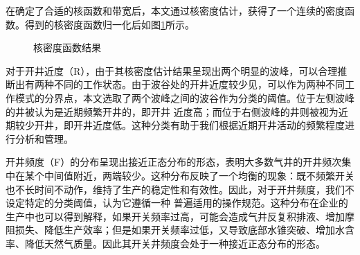 在确定了合适的核函数和带宽后，本文通过核密度估计，获得了一个连续的密度函数。得到的核密度函数归一化后如图\ref{fig:KDE}所示。
\begin{figure}[H]
    \centering
    \hfil
    \hfil
    \caption{核密度函数结果}
    \label{fig:KDE}
\end{figure}
\par
对于开井近度（R），由于其核密度估计结果呈现出两个明显的波峰，可以合理推断出有两种不同的工作状态。由于波谷处的开井近度较少见，可以作为两种不同工作模式的分界点，本文选取了两个波峰之间的波谷作为分类的阈值。位于左侧波峰的井被认为是近期频繁开井的，即开井
近度高；而位于右侧波峰的井则被视为近期较少开井，即开井近度低。这种分类有助于我们根据近期开井活动的频繁程度进行分析和管理。

开井频度（F）的分布呈现出接近正态分布的形态，表明大多数气井的开井频次集中在某个中间值附近，两端较少。这种分布反映了一个均衡的现象：既不频繁开关也不长时间不动作，维持了生产的稳定性和有效性。因此，对于开井频度，我们不设定特定的分类阈值，认为它遵循一种
普遍适用的操作规范。这种分布在企业的生产中也可以得到解释，如果开关频率过高，可能会造成气井反复积排液、增加摩阻损失、降低生产效率；但是如果开关频率过低，又导致底部水锥突破、增加水含率、降低天然气质量。因此其开关井频度会处于一种接近正态分布的形态。

